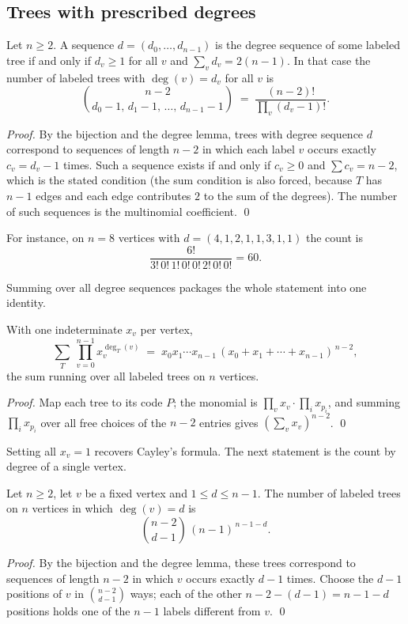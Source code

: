 \documentclass[11pt]{article}
\begin{document}
\subsection{Trees with prescribed degrees}
\begin{theorembox}
Let $n\ge2$. A sequence $d=(d_0,\dots,d_{n-1})$ is the degree sequence of
some labeled tree if and only if $d_v\ge1$ for all $v$ and
$\sum_v d_v=2(n-1)$. In that case the number of labeled trees with
$\deg(v)=d_v$ for all $v$ is
\[
  \binom{n-2}{d_0-1,\,d_1-1,\,\dots,\,d_{n-1}-1}
  \;=\;\frac{(n-2)!}{\prod_{v}(d_v-1)!}.
\]

\emph{Proof.} By the bijection and the degree lemma, trees with degree
sequence $d$ correspond to sequences of length $n-2$ in which each label
$v$ occurs exactly $c_v=d_v-1$ times. Such a sequence exists if and only
if $c_v\ge0$ and $\sum c_v=n-2$, which is the stated condition (the sum
condition is also forced, because $T$ has $n-1$ edges and each edge
contributes $2$ to the sum of the degrees). The number of such
sequences is the multinomial coefficient. \qed
\end{theorembox}

For instance, on $n=8$ vertices with $d=(4,1,2,1,1,3,1,1)$ the count is
\[
  \frac{6!}{3!\,0!\,1!\,0!\,0!\,2!\,0!\,0!}=60 .
\]

Summing over all degree sequences packages the whole statement into one
identity.
\begin{theorembox}
With one indeterminate $x_v$ per vertex,
\[
  \sum_{T}\ \prod_{v=0}^{n-1}x_v^{\deg_T(v)}
  \;=\; x_0x_1\cdots x_{n-1}\,(x_0+x_1+\cdots+x_{n-1})^{\,n-2},
\]
the sum running over all labeled trees on $n$ vertices.

\emph{Proof.} Map each tree to its code $P$; the monomial is
$\prod_v x_v\cdot\prod_{i}x_{p_i}$, and summing $\prod_i x_{p_i}$ over all
free choices of the $n-2$ entries gives $(\sum_v x_v)^{n-2}$. \qed
\end{theorembox}

Setting all $x_v=1$ recovers Cayley's formula. The next statement is the
count by degree of a single vertex.

\begin{theorembox}
Let $n\ge2$, let $v$ be a fixed vertex and $1\le d\le n-1$. The number of
labeled trees on $n$ vertices in which $\deg(v)=d$ is
\[
  \binom{n-2}{d-1}\,(n-1)^{\,n-1-d}.
\]

\emph{Proof.} By the bijection and the degree lemma, these trees
correspond to sequences of length $n-2$ in which $v$ occurs exactly $d-1$
times. Choose the $d-1$ positions of $v$ in $\binom{n-2}{d-1}$ ways;
each of the other $n-2-(d-1)=n-1-d$ positions holds one of the $n-1$
labels different from $v$. \qed
\end{theorembox}
\end{document}
